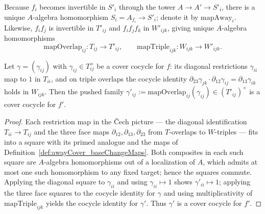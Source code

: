 \begin{definition}
  \label{def:awayCover_baseChangeMaps}
  \leanok
  Because \(f_i\) becomes invertible in \(S'_i\) through the tower \(A \to A' \to S'_i\),
  there is a unique \(A\)-algebra homomorphism \(S_i = A_{f_i} \to S'_i\); denote it by
  \(\mathrm{mapAway}_i\).  Likewise, \(f_i f_j\) is invertible in \(T'_{ij}\) and
  \(f_i f_j f_k\) in \(W'_{ijk}\), giving unique \(A\)-algebra homomorphisms
  \[
    \mathrm{mapOverlap}_{ij} \colon T_{ij} \to T'_{ij}, \qquad
    \mathrm{mapTriple}_{ijk} \colon W_{ijk} \to W'_{ijk}.
  \]
\end{definition}

\begin{theorem}
  \label{thm:awayCover_isCoverCocycle_baseChange}
  \leanok
  Let \(\gamma = (\gamma_{ij})\) with \(\gamma_{ij} \in T_{ij}^{\times}\) be a cover cocycle
  for \(f\): its diagonal restrictions \(\gamma_{ii}\) map to \(1\) in \(T_{ii}\), and on
  triple overlaps the cocycle identity
  \(\partial_{23}\gamma_{jk} \cdot \partial_{12}\gamma_{ij} = \partial_{13}\gamma_{ik}\) holds
  in \(W_{ijk}\).  Then the pushed family
  \(\gamma'_{ij} := \mathrm{mapOverlap}_{ij}(\gamma_{ij}) \in (T'_{ij})^{\times}\) is a cover
  cocycle for \(f'\).
\end{theorem}
\begin{proof}
  \leanok
  Each restriction map in the \v Cech picture — the diagonal identification \(T_{ii} \to
  T_{ij}\) and the three face maps \(\partial_{12}, \partial_{13}, \partial_{23}\) from
  \(T\)-overlaps to \(W\)-triples — fits into a square with its primed analogue and the maps of
  Definition~\ref{def:awayCover_baseChangeMaps}.  Both composites in each such square are
  \(A\)-algebra homomorphisms out of a localization of \(A\), which admits at most one such
  homomorphism to any fixed target; hence the squares commute.  Applying the diagonal square to
  \(\gamma_{ii}\) and using \(\gamma_{ii} \mapsto 1\) shows \(\gamma'_{ii} \mapsto 1\); applying
  the three face squares to the cocycle identity for \(\gamma\) and using multiplicativity of
  \(\mathrm{mapTriple}_{ijk}\) yields the cocycle identity for \(\gamma'\).  Thus \(\gamma'\) is
  a cover cocycle for \(f'\).
\end{proof}


